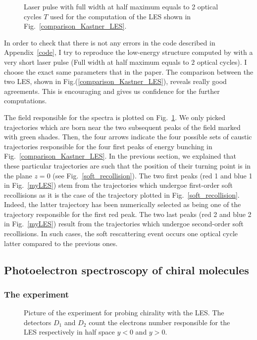 \documentclass[a4paper]{article}
\begin{document}
\begin{figure}[htp]
 \resizebox{1\textwidth}{!}{}
 \caption{Laser pulse with full width at half maximum equals to 2 optical cycles $T$ used for the computation of the LES shown in Fig.~\ref{comparison_Kastner_LES}. }
\label{laser_pulse}
\end{figure}

In order to check that there is not any errors in the code described in Appendix~\ref{code}, I try to reproduce the low-energy structure computed by \cite{Kastner_2012_pulse} with a very short laser pulse (Full width at half maximum equals to $2$ optical cycles). I choose the exact same parameters that in the paper. The comparison between the two LES, shown in Fig.(\ref{comparison_Kastner_LES}), reveals really good agreements. This is encouraging and gives us confidence for the further computations.
\par
The field responsible for the spectra is plotted on Fig.~\ref{laser_pulse}. We only picked trajectories which are born near the two subsequent peaks of the field marked with green shades. Then, the four arrows indicate the four possible sets of caustic trajectories responsible for the four first peaks of energy bunching in Fig.~\ref{comparison_Kastner_LES}. In the previous section, we explained that these particular trajectories are such that the position of their turning point is in the plane $z=0$ (see Fig.~\ref{soft_recollision}). The two first peaks (red 1 and blue 1 in Fig.~\ref{myLES}) stem from the trajectories which undergoe first-order soft recollisions \cite{Kastner_2012_pulse} as it is the case of the trajectory plotted in Fig.~\ref{soft_recollision}. Indeed, the latter trajectory has been numerically selected as being one of the trajectory responsible for the first red peak. 
The two last peaks (red 2 and blue 2 in Fig.~\ref{myLES}) result from the trajectories which undergoe second-order soft recollisions. In such cases, the soft rescattering event occurs one optical cycle latter compared to the previous ones.

\subsection{Photoelectron spectroscopy of chiral molecules}
\subsubsection{The experiment}

\begin{figure}[htp]
 \resizebox{1\textwidth}{!}{}
 \caption{Picture of the experiment for probing chirality with the LES. The detectors $D_{1}$ and $D_{2}$ count the electrons number responsible for the LES respectively in half space $y<0$ and $y>0$.}
\label{LES_chiral_experiment}
\end{figure}
\end{document}

